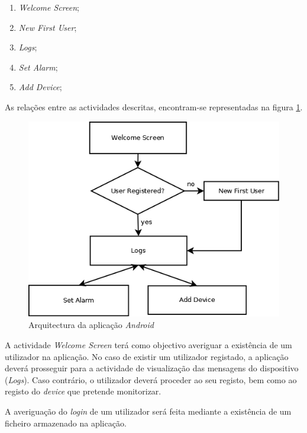 \documentclass[a4paper]{article}
\begin{document}
\begin{enumerate}
\item \textit{Welcome Screen};
\item \textit{New First User};
\item \textit{Logs};
\item \textit{Set Alarm};
\item \textit{Add Device};
\end{enumerate} 
\vspace{35mm}

As relações entre as actividades descritas, encontram-se representadas na figura \ref{fig:app_android_geral}.

\vspace{5mm}

\begin{figure}[hb]
  \centering
  \includegraphics[scale=0.40]{App_geral.png}
  \caption{Arquitectura da aplicação \textit{Android}}
  \label{fig:app_android_geral}
\end{figure}

A actividade \textit{Welcome Screen} terá como objectivo averiguar a existência de um utilizador na aplicação. No caso de existir um utilizador registado, a aplicação deverá prosseguir para a actividade de visualização das mensagens do dispositivo (\textit{Logs}). Caso contrário, o utilizador deverá proceder ao seu registo, bem como ao registo do \textit{device} que pretende monitorizar.

A averiguação do \textit{login} de um utilizador será feita mediante a existência de um ficheiro armazenado na aplicação.
\end{document}
